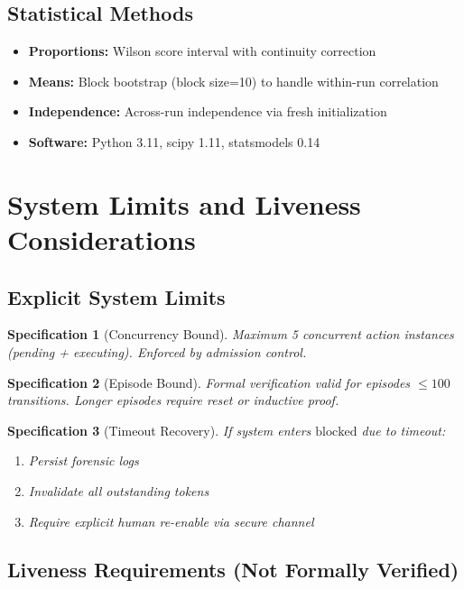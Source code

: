\documentclass[12pt]{article}
\newtheorem{spec}{Specification}[section]
\begin{document}
\subsection{Statistical Methods}

\begin{itemize}
    \item \textbf{Proportions:} Wilson score interval with continuity correction
    \item \textbf{Means:} Block bootstrap (block size=10) to handle within-run correlation
    \item \textbf{Independence:} Across-run independence via fresh initialization
    \item \textbf{Software:} Python 3.11, scipy 1.11, statsmodels 0.14
\end{itemize}

\section{System Limits and Liveness Considerations}

\subsection{Explicit System Limits}

\begin{spec}[Concurrency Bound]
Maximum 5 concurrent action instances (pending + executing). Enforced by admission control.
\end{spec}

\begin{spec}[Episode Bound]
Formal verification valid for episodes $\leq 100$ transitions. Longer episodes require reset or inductive proof.
\end{spec}

\begin{spec}[Timeout Recovery]
If system enters $\text{blocked}$ due to timeout:
\begin{enumerate}
    \item Persist forensic logs
    \item Invalidate all outstanding tokens
    \item Require explicit human re-enable via secure channel
\end{enumerate}
\end{spec}

\subsection{Liveness Requirements (Not Formally Verified)}
\end{document}
